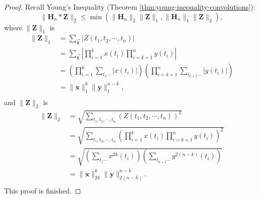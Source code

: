 \documentclass[twoside,11pt]{article}
\def\tvar#1{\mathbf{#1}} %
\def\vsymb#1{\vec{\mathbf{#1}}}
\begin{document}
\begin{proof}
  Recall Young's Inequality (Theorem \ref{thm:young-inequality-convolutions}):
  \begin{equation*}
    \| \tvar{H}_n * \tvar{Z} \|_2 \le \min\left(
    \| \tvar{H}_n \|_2 \| \tvar{Z} \|_1,
    \| \tvar{H}_n \|_1 \| \tvar{Z} \|_2
    \right),
  \end{equation*}
  where \(\| \tvar{Z} \|_1\) is
  \begin{equation*}
    \begin{aligned}
      \| \tvar{Z} \|_1
       & = \sum_{\vsymb{t}} | Z(t_1, t_2, \cdots, t_n) | \\
       & = \sum_{\vsymb{t}} \left|
      \prod_{i=1}^{k} x(t_i)
      \prod_{i=k+1}^{n} y(t_i)
      \right|                                            \\
       & = \left(
      \prod_{i=1}^{k} \sum_{t_1 \cdots} \left| x(t_i) \right|
      \right)
      \left(
      \prod_{i=k+1}^{n} \sum_{t_{k+1} \cdots} \left| y(t_i) \right|
      \right)                                            \\
       & = \| \tvar{x} \|_1^k \| \tvar{y} \|_1^{n-k},    \\
    \end{aligned}
  \end{equation*}
  and \(\| \tvar{Z} \|_2\) is
  \begin{equation*}
    \begin{aligned}
      \| \tvar{Z} \|_2
       & = \sqrt{\sum_{t_1, t_2, \cdots, t_n} ( Z(t_1, t_2, \cdots, t_n) )^2 } \\
       & = \sqrt{ \sum_{t_1, t_2, \cdots, t_n} \left(
        \prod_{i=1}^{k} x(t_i)
        \prod_{i=k+1}^{n} y(t_i)
      \right)^2}                                                               \\
       & = \sqrt{\left( \sum_{t_1 \cdots} x^{2k}(t_i) \right)
      \left( \sum_{t_{k+1} \cdots} y^{2(n-k)}(t_i) \right)}                    \\
       & = \| \tvar{x} \|_{2k}^k \| \tvar{y} \|_{2(n-k)}^{n-k}.                \\
    \end{aligned}
  \end{equation*}
  This proof is finished.
\end{proof}
\end{document}
